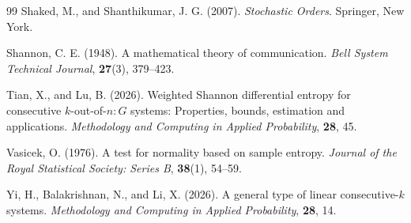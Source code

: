 \documentclass[12pt,a4paper]{article}
\numberwithin{equation}{section}
\begin{document}
\begin{thebibliography}{99}
Shaked, M., and Shanthikumar, J. G. (2007). \textit{Stochastic Orders}. Springer, New York.

Shannon, C. E. (1948). A mathematical theory of communication. \textit{Bell System Technical Journal}, \textbf{27}(3), 379--423.

Tian, X., and Lu, B. (2026). Weighted Shannon differential entropy for consecutive $k$-out-of-$n:G$ systems: Properties, bounds, estimation and applications. \textit{Methodology and Computing in Applied Probability}, \textbf{28}, 45.

Vasicek, O. (1976). A test for normality based on sample entropy. \textit{Journal of the Royal Statistical Society: Series B}, \textbf{38}(1), 54--59.

Yi, H., Balakrishnan, N., and Li, X. (2026). A general type of linear consecutive-$k$ systems. \textit{Methodology and Computing in Applied Probability}, \textbf{28}, 14.
\end{thebibliography}
\end{document}
